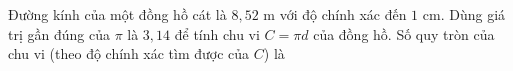 \begin{ex}
Đường kính của một đồng hồ cát là $8{,}52$ m với độ chính xác đến $1$ cm. Dùng giá trị gần đúng của $\pi$ là $3{,}14$ để tính chu vi $C=\pi d$ của đồng hồ. Số quy tròn của chu vi (theo độ chính xác tìm được của $C$) là
\end{ex}
